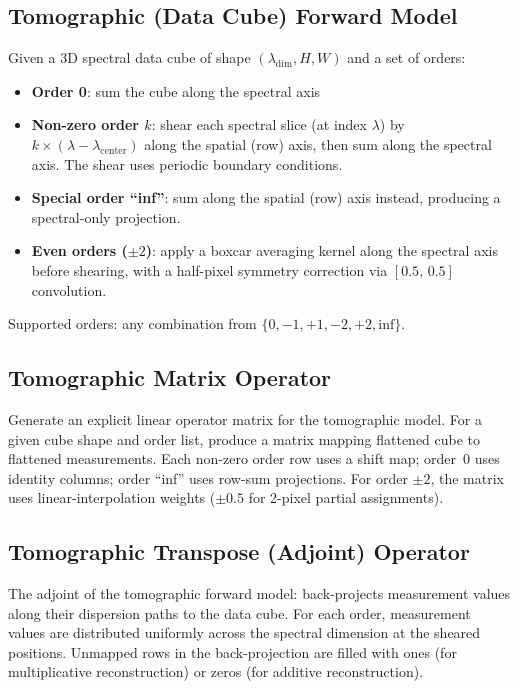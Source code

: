 \documentclass[11pt,a4paper]{article}
\begin{document}
\subsection{Tomographic (Data Cube) Forward Model}
Given a 3D spectral data cube of shape $(\lambda_{\text{dim}}, H, W)$ and a set of orders:

\begin{itemize}[nosep]
  \item \textbf{Order 0}: sum the cube along the spectral axis
  \item \textbf{Non-zero order $k$}: shear each spectral slice (at index $\lambda$) by $k \times (\lambda - \lambda_{\text{center}})$ along the spatial (row) axis, then sum along the spectral axis. The shear uses periodic boundary conditions.
  \item \textbf{Special order ``inf''}: sum along the spatial (row) axis instead, producing a spectral-only projection.
  \item \textbf{Even orders ($\pm 2$)}: apply a boxcar averaging kernel along the spectral axis before shearing, with a half-pixel symmetry correction via $[0.5,\,0.5]$ convolution.
\end{itemize}
Supported orders: any combination from $\{0, -1, +1, -2, +2, \text{inf}\}$.

\subsection{Tomographic Matrix Operator}
Generate an explicit linear operator matrix for the tomographic model. For a given cube shape and order list, produce a matrix mapping flattened cube to flattened measurements. Each non-zero order row uses a shift map; order~0 uses identity columns; order ``inf'' uses row-sum projections. For order $\pm2$, the matrix uses linear-interpolation weights ($\pm0.5$ for 2-pixel partial assignments).

\subsection{Tomographic Transpose (Adjoint) Operator}
The adjoint of the tomographic forward model: back-projects measurement values along their dispersion paths to the data cube. For each order, measurement values are distributed uniformly across the spectral dimension at the sheared positions. Unmapped rows in the back-projection are filled with ones (for multiplicative reconstruction) or zeros (for additive reconstruction).
\end{document}
